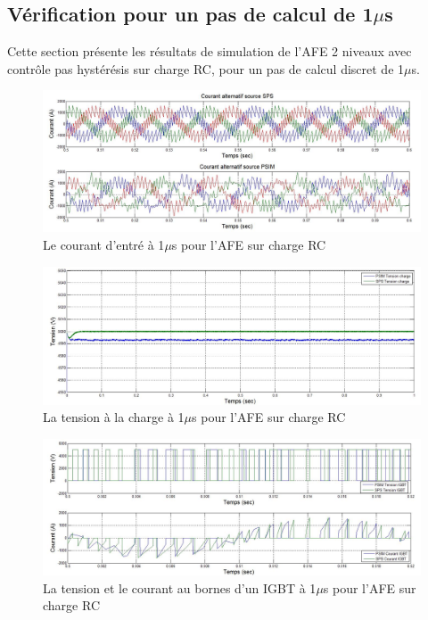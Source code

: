 \clearpage

\subsection{Vérification pour un pas de calcul de 1$\mu$s}
Cette section présente les résultats de simulation de l'AFE 2 niveaux avec contrôle pas hystérésis sur charge RC, pour un pas de calcul discret de 1$\mu$s. 




\begin{figure}[htb]
\centering
\includegraphics[scale=0.5]{fig/AFERC/cour_al.jpg}
\caption{Le courant d'entré à 1$\mu$s pour l'AFE sur charge RC}
\label{AF_RC_cou}
\end{figure}




\begin{figure}[htb]
\centering
\includegraphics[scale=0.5]{fig/AFERC/vch.jpg}
\caption{La tension à la charge à 1$\mu$s pour l'AFE sur charge RC}
\label{AF_RC_ten}
\end{figure}



\begin{figure}[htb]
\centering
\includegraphics[scale=0.5]{fig/AFERC/IGBT.jpg}
\caption{La tension et le courant au bornes d'un IGBT à 1$\mu$s pour l'AFE sur charge RC}
\label{AF_RC_igbt}
\end{figure}

